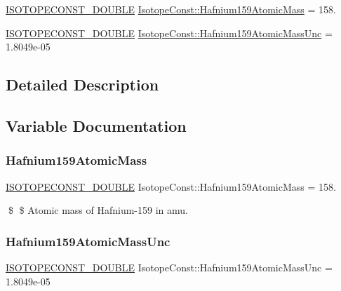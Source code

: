 \begin{DoxyCompactItemize}
\item 
\mbox{\hyperlink{group___isotope_const-_macros_ga8f45a7272ce02c0b4c65c44636ed719a}{I\+S\+O\+T\+O\+P\+E\+C\+O\+N\+S\+T\+\_\+\+D\+O\+U\+B\+LE}} \mbox{\hyperlink{group___isotope_const-_hafnium-_hf159_ga3fdf47ee6507aabd7338c4c3e4e57a41}{Isotope\+Const\+::\+Hafnium159\+Atomic\+Mass}} = 158.
\item 
\mbox{\hyperlink{group___isotope_const-_macros_ga8f45a7272ce02c0b4c65c44636ed719a}{I\+S\+O\+T\+O\+P\+E\+C\+O\+N\+S\+T\+\_\+\+D\+O\+U\+B\+LE}} \mbox{\hyperlink{group___isotope_const-_hafnium-_hf159_gadbd792214bfa45e401b13c73adaddb4c}{Isotope\+Const\+::\+Hafnium159\+Atomic\+Mass\+Unc}} = 1.\+8049e-\/05
\end{DoxyCompactItemize}


\subsection{Detailed Description}


\subsection{Variable Documentation}
\mbox{\label{group___isotope_const-_hafnium-_hf159_ga3fdf47ee6507aabd7338c4c3e4e57a41}} 
\subsubsection{\texorpdfstring{Hafnium159\+Atomic\+Mass}{Hafnium159AtomicMass}}
{\footnotesize\ttfamily \mbox{\hyperlink{group___isotope_const-_macros_ga8f45a7272ce02c0b4c65c44636ed719a}{I\+S\+O\+T\+O\+P\+E\+C\+O\+N\+S\+T\+\_\+\+D\+O\+U\+B\+LE}} Isotope\+Const\+::\+Hafnium159\+Atomic\+Mass = 158.}

\$ \$ Atomic mass of Hafnium-\/159 in amu. \mbox{\label{group___isotope_const-_hafnium-_hf159_gadbd792214bfa45e401b13c73adaddb4c}} 
\subsubsection{\texorpdfstring{Hafnium159\+Atomic\+Mass\+Unc}{Hafnium159AtomicMassUnc}}
{\footnotesize\ttfamily \mbox{\hyperlink{group___isotope_const-_macros_ga8f45a7272ce02c0b4c65c44636ed719a}{I\+S\+O\+T\+O\+P\+E\+C\+O\+N\+S\+T\+\_\+\+D\+O\+U\+B\+LE}} Isotope\+Const\+::\+Hafnium159\+Atomic\+Mass\+Unc = 1.\+8049e-\/05}

